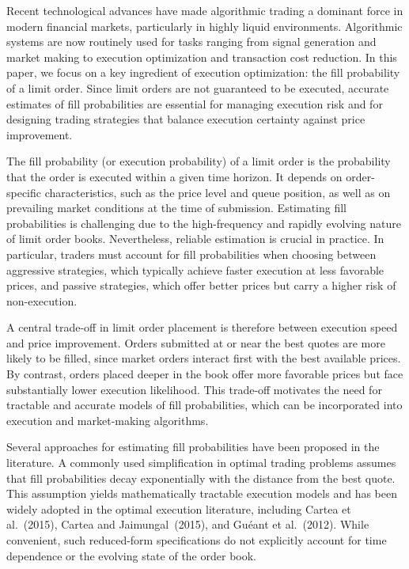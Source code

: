 \documentclass[11pt]{article}
\begin{document}
Recent technological advances have made algorithmic trading a dominant force in modern financial markets, particularly in highly liquid environments. Algorithmic systems are now routinely used for tasks ranging from signal generation and market making to execution optimization and transaction cost reduction. In this paper, we focus on a key ingredient of execution optimization: the fill probability of a limit order. Since limit orders are not guaranteed to be executed, accurate estimates of fill probabilities are essential for managing execution risk and for designing trading strategies that balance execution certainty against price improvement.

The fill probability (or execution probability) of a limit order is the probability that the order is executed within a given time horizon. It depends on order-specific characteristics, such as the price level and queue position, as well as on prevailing market conditions at the time of submission. Estimating fill probabilities is challenging due to the high-frequency and rapidly evolving nature of limit order books. Nevertheless, reliable estimation is crucial in practice. In particular, traders must account for fill probabilities when choosing between aggressive strategies, which typically achieve faster execution at less favorable prices, and passive strategies, which offer better prices but carry a higher risk of non-execution.

A central trade-off in limit order placement is therefore between execution speed and price improvement. Orders submitted at or near the best quotes are more likely to be filled, since market orders interact first with the best available prices. By contrast, orders placed deeper in the book offer more favorable prices but face substantially lower execution likelihood. This trade-off motivates the need for tractable and accurate models of fill probabilities, which can be incorporated into execution and market-making algorithms.

Several approaches for estimating fill probabilities have been proposed in the literature. A commonly used simplification in optimal trading problems assumes that fill probabilities decay exponentially with the distance from the best quote. This assumption yields mathematically tractable execution models and has been widely adopted in the optimal execution literature, including Cartea et al.~(2015), Cartea and Jaimungal~(2015), and Gu\'eant et al.~(2012). While convenient, such reduced-form specifications do not explicitly account for time dependence or the evolving state of the order book.
\end{document}
